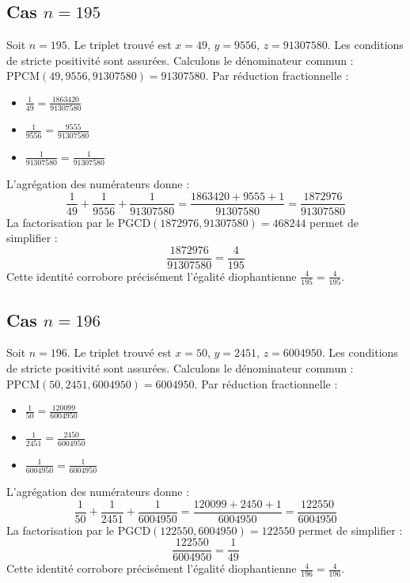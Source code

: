 \documentclass[11pt,a4paper]{article}
\begin{document}
\subsection{Cas $n = 195$}
Soit $n = 195$. Le triplet trouvé est $x = 49$, $y = 9556$, $z = 91307580$.
Les conditions de stricte positivité sont assurées.
Calculons le dénominateur commun : $\text{PPCM}(49, 9556, 91307580) = 91307580$.
Par réduction fractionnelle :
\begin{itemize}
    \item $\frac{1}{49} = \frac{1863420}{91307580}$
    \item $\frac{1}{9556} = \frac{9555}{91307580}$
    \item $\frac{1}{91307580} = \frac{1}{91307580}$
\end{itemize}
L'agrégation des numérateurs donne :
$$ \frac{1}{49} + \frac{1}{9556} + \frac{1}{91307580} = \frac{1863420 + 9555 + 1}{91307580} = \frac{1872976}{91307580} $$
La factorisation par le $\text{PGCD}(1872976, 91307580) = 468244$ permet de simplifier :
$$ \frac{1872976}{91307580} = \frac{4}{195} $$
Cette identité corrobore précisément l'égalité diophantienne $\frac{4}{195} = \frac{4}{195}$.

\subsection{Cas $n = 196$}
Soit $n = 196$. Le triplet trouvé est $x = 50$, $y = 2451$, $z = 6004950$.
Les conditions de stricte positivité sont assurées.
Calculons le dénominateur commun : $\text{PPCM}(50, 2451, 6004950) = 6004950$.
Par réduction fractionnelle :
\begin{itemize}
    \item $\frac{1}{50} = \frac{120099}{6004950}$
    \item $\frac{1}{2451} = \frac{2450}{6004950}$
    \item $\frac{1}{6004950} = \frac{1}{6004950}$
\end{itemize}
L'agrégation des numérateurs donne :
$$ \frac{1}{50} + \frac{1}{2451} + \frac{1}{6004950} = \frac{120099 + 2450 + 1}{6004950} = \frac{122550}{6004950} $$
La factorisation par le $\text{PGCD}(122550, 6004950) = 122550$ permet de simplifier :
$$ \frac{122550}{6004950} = \frac{1}{49} $$
Cette identité corrobore précisément l'égalité diophantienne $\frac{4}{196} = \frac{4}{196}$.
\end{document}
